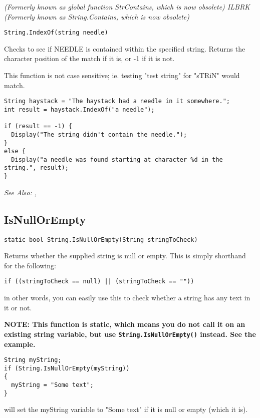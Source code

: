 \it{(Formerly known as global function StrContains, which is now obsolete)} ILBRK
\it{(Formerly known as String.Contains, which is now obsolete)}

\begin{verbatim}
String.IndexOf(string needle)
\end{verbatim}
Checks to see if NEEDLE is contained within the specified string. Returns the character position
of the match if it is, or -1 if it is not.

This function is not case sensitive; ie. testing "test string" for "sTRiN" would match.

\begin{verbatim}
String haystack = "The haystack had a needle in it somewhere.";
int result = haystack.IndexOf("a needle");

if (result == -1) {
  Display("The string didn't contain the needle.");
}
else {
  Display("a needle was found starting at character %d in the string.", result);
}
\end{verbatim}

\it{See Also:} ,


\subsection{IsNullOrEmpty}\label{String.IsNullOrEmpty}%

\begin{verbatim}
static bool String.IsNullOrEmpty(String stringToCheck)
\end{verbatim}
Returns whether the supplied string is null or empty. This is simply shorthand for the following:
\begin{verbatim}
if ((stringToCheck == null) || (stringToCheck == ""))
\end{verbatim}
in other words, you can easily use this to check whether a string has any text in it or not.

\bf{NOTE:} This function is static, which means you do not call it on an existing
string variable, but use \verb$String.IsNullOrEmpty()$ instead. See the example.

\begin{verbatim}
String myString;
if (String.IsNullOrEmpty(myString))
{
  myString = "Some text";
}
\end{verbatim}
will set the myString variable to "Some text" if it is null or empty (which it is).

